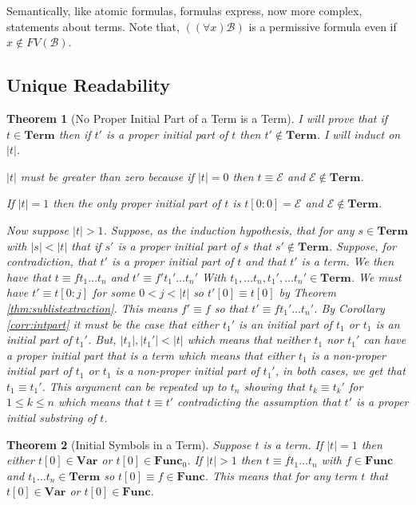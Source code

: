 \documentclass[12pt]{article}
\theoremstyle{break}
\theoremstyle{break}
\newtheorem{theorem}{Theorem}[section]
\theoremstyle{break}
\theoremstyle{break}
\newcommand{\mc}[1]{\mathcal{#1}}
\begin{document}
Semantically, like atomic formulas, formulas express, now more complex, statements about terms.
Note that, $((\forall x) \mc{B})$ is a permissive formula even if $x\not \in FV(\mc{B})$.

\subsection{Unique Readability}

\begin{theorem}[No Proper Initial Part of a Term is a Term]
\label{thm:termnopropinit}
I will prove that if $t\in\textbf{Term}$ then if $t'$ is a proper initial part of $t$ then $t'\not \in \textbf{Term}$. I will induct on $|t|$.

$|t|$ must be greater than zero because if $|t| = 0$ then $t \equiv \mc{E}$ and $\mc{E}\not \in \textbf{Term}$.

If $|t| = 1$ then the only proper initial part of $t$ is $t[0:0] = \mc{E}$ and $\mc{E} \not \in \textbf{Term}$.

Now suppose $|t|>1$. 
Suppose, as the induction hypothesis, that for any $s\in\textbf{Term}$ with $|s|<|t|$ that if $s'$ is a proper initial part of $s$ that $s'\not \in \textbf{Term}$. 
Suppose, for contradiction, that $t'$ is a proper initial part of $t$ and that $t'$ is a term. 
We then have that $t \equiv ft_1\ldots t_n$ and $t' \equiv f't_1'\ldots t_n'$ With $t_1, \ldots t_n, t_1', \ldots t_n' \in \textbf{Term}$. 
We must have $t' \equiv t[0:j]$ for some $0 < j < |t|$ so $t'[0] \equiv t[0]$ by Theorem \ref{thm:sublistextraction}.
This means $f' \equiv f$ so that $t' \equiv ft_1'\ldots t_n'$. 
By Corollary \ref{corr:intpart} it must be the case that either $t_1'$ is an initial part of $t_1$ or $t_1$ is an initial part of $t_1'$. But, $|t_1|, |t_1'| < |t|$ which means that neither $t_1$ nor $t_1'$ can have a proper initial part that is a term which means that either $t_1$ is a non-proper initial part of $t_1$ or $t_1$ is a non-proper initial part of $t_1'$, in both cases, we get that $t_1\equiv t_1'$.
This argument can be repeated up to $t_n$ showing that $t_k \equiv t_k'$ for $1 \le k \le n$ which means that $t \equiv t'$ contradicting the assumption that $t'$ is a proper initial substring of $t$.
\end{theorem}

\begin{theorem}[Initial Symbols in a Term]
\label{thm:initsymbterm}
Suppose $t$ is a term. If $|t|=1$ then either $t[0] \in \textbf{Var}$ or $t[0] \in \textbf{Func}_0$.
If $|t|>1$ then $t\equiv ft_1\ldots t_n$ with $f\in\textbf{Func}$ and $t_1\ldots t_n\in\textbf{Term}$ so $t[0]\equiv f \in \textbf{Func}$.
This means that for any term $t$ that $t[0] \in \textbf{Var}$ or $t[0]\in\textbf{Func}$.
\end{theorem}
\end{document}

